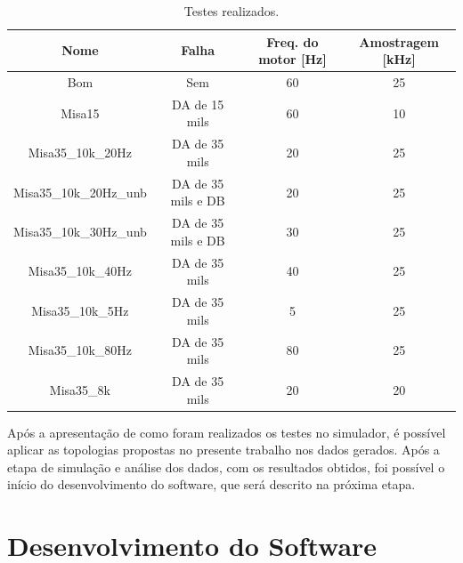 \begin{table}[H]
    \caption{Testes realizados.}
    \label{tab:simulador}
    \centering%
    \begin{minipage}{\textwidth}
      \begin{tabular*}{\textwidth}{cccc}
        \hline
        {Nome}                   & Falha                     & Freq. do motor [Hz] & Amostragem [kHz]\\ \hline
        \hline
        Bom                      &  Sem                      &      60             &    25  \\ 
        Misa15                   &  DA de 15 mils            &      60             &    10  \\
        Misa35\_10k\_20Hz        &  DA de 35 mils            &      20             &    25  \\
        Misa35\_10k\_20Hz\_unb   &  DA de 35 mils e DB       &      20             &    25  \\
        Misa35\_10k\_30Hz\_unb   &  DA de 35 mils e DB       &      30             &    25  \\
        Misa35\_10k\_40Hz        &  DA de 35 mils            &      40             &    25  \\
        Misa35\_10k\_5Hz         &  DA de 35 mils            &      5              &    25  \\
        Misa35\_10k\_80Hz        &  DA de 35 mils            &      80             &    25  \\
        Misa35\_8k               &  DA de 35 mils            &      20             &    20  \\ \hline
      \end{tabular*}
    \end{minipage}
  \end{table}
  
Após a apresentação de como foram realizados os testes no simulador, é possível aplicar as topologias propostas no presente trabalho nos
dados gerados. Após a etapa de simulação e análise dos dados, com os resultados obtidos, foi possível o início do desenvolvimento do software,
que será descrito na próxima etapa. 


% 

\section{Desenvolvimento do Software}

